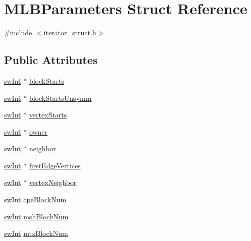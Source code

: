 \hypertarget{structMLBParameters}{
\section{MLBParameters Struct Reference}
\label{structMLBParameters}
}


{\ttfamily \#include $<$iterator\_\-struct.h$>$}\subsection*{Public Attributes}
\begin{DoxyCompactItemize}
\item 
\hyperlink{swMacro_8h_a113cf5f6b5377cdf3fac6aa4e443e9aa}{swInt} $\ast$ \hyperlink{structMLBParameters_af9b86ffe9fdb9d60b4b4adb2983c60d6}{blockStarts}
\item 
\hyperlink{swMacro_8h_a113cf5f6b5377cdf3fac6aa4e443e9aa}{swInt} $\ast$ \hyperlink{structMLBParameters_a0de1bb277dcff80762fd752f77ec75b9}{blockStartsUnsymm}
\item 
\hyperlink{swMacro_8h_a113cf5f6b5377cdf3fac6aa4e443e9aa}{swInt} $\ast$ \hyperlink{structMLBParameters_aba1b1654ae819032fd78dac4febe0101}{vertexStarts}
\item 
\hyperlink{swMacro_8h_a113cf5f6b5377cdf3fac6aa4e443e9aa}{swInt} $\ast$ \hyperlink{structMLBParameters_ac7483bc6365005100466360bb542fc31}{owner}
\item 
\hyperlink{swMacro_8h_a113cf5f6b5377cdf3fac6aa4e443e9aa}{swInt} $\ast$ \hyperlink{structMLBParameters_a2f37a3f6bfcd23b1f2e57c613325484d}{neighbor}
\item 
\hyperlink{swMacro_8h_a113cf5f6b5377cdf3fac6aa4e443e9aa}{swInt} $\ast$ \hyperlink{structMLBParameters_aef7de09684f1521d2b1eeacfcd2b6d0d}{firstEdgeVertices}
\item 
\hyperlink{swMacro_8h_a113cf5f6b5377cdf3fac6aa4e443e9aa}{swInt} $\ast$ \hyperlink{structMLBParameters_aed04421df60bb1fa6144f4f8b03b789a}{vertexNeighbor}
\item 
\hyperlink{swMacro_8h_a113cf5f6b5377cdf3fac6aa4e443e9aa}{swInt} \hyperlink{structMLBParameters_ad5c2db1dad6930b3786e050d0f52c436}{cpeBlockNum}
\item 
\hyperlink{swMacro_8h_a113cf5f6b5377cdf3fac6aa4e443e9aa}{swInt} \hyperlink{structMLBParameters_ad276c2308b307b00101575ba6df0cb76}{mshBlockNum}
\item 
\hyperlink{swMacro_8h_a113cf5f6b5377cdf3fac6aa4e443e9aa}{swInt} \hyperlink{structMLBParameters_a110a1c5cb8f84d662e0de090422104fa}{mtxBlockNum}

\end{DoxyCompactItemize}
